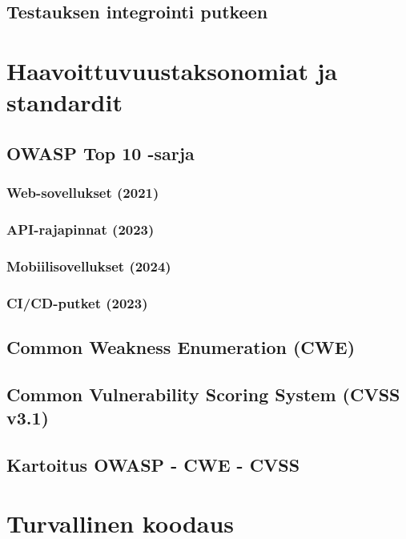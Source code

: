 \documentclass[bscthesis,finnish,oneside,biblatex]{uefcsthesis}
\begin{document}
  \subsection{Testauksen integrointi putkeen}

\section{Haavoittuvuustaksonomiat ja standardit}
\label{sec:taxonomies}

  \subsection{OWASP Top 10 -sarja}
    \subsubsection{Web-sovellukset (2021)}   %
    \subsubsection{API-rajapinnat (2023)}     %
    \subsubsection{Mobiilisovellukset (2024)} %
    \subsubsection{CI/CD-putket (2023)}       %

  \subsection{Common Weakness Enumeration (CWE)}
  \subsection{Common Vulnerability Scoring System (CVSS v3.1)}
  \subsection{Kartoitus OWASP - CWE - CVSS}

\section{Turvallinen koodaus}
\label{sec:secure-code}
\end{document}
